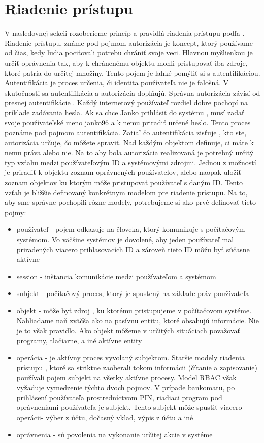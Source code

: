 \section{Riadenie prístupu}
V nasledovnej sekcii rozoberieme princíp a pravidlá riadenia prístupu podľa \cite{kuhn}. Riadenie prístupu, známe pod pojmom autorizácia je koncept, ktorý používame od čias, kedy ľudia pociťovali potrebu chrániť svoje veci. Hlavnou myšlienkou je určiť oprávnenia tak, aby k chránenému objektu mohli pristupovať iba zdroje, ktoré patria do určitej množiny. Tento pojem je ľahké pomýliť si s autentifikáciou. Autentifikácia je  proces určenia, či identita používateľa nie je falošná. V skutočnosti sa autentifikácia a autorizácia doplňujú. Správna autorizácia závisí od presnej autentifikácie . Každý internetový používateľ  rozdiel dobre pochopí na príklade zadávania hesla. Ak sa chce Janko prihlásiť do systému , musí zadať svoje používateľské meno janko96 a k nemu priradiť určené heslo. Tento proces poznáme pod pojmom autentifikácia.  Zatiaľ čo autentifikácia zisťuje , kto ste, autorizácia určuje, čo môžete spraviť. Nad každým objektom definuje, ci máte k nemu práva alebo nie. Na to aby bola autorizácia realizovaná je potrebný určitý typ vzťahu medzi používateľovým ID a systémovými zdrojmi. Jednou z možností je priradiť k objektu zoznam oprávnených používateľov, alebo naopak uložiť zoznam objektov ku ktorým môže pristupovať používateľ s daným ID. Tento vzťah je bližšie definovaný konkrétnym modelom pre riadenie prístupu. Na to, aby sme správne pochopili rôzne modely, potrebujeme si ako prvé definovať tieto pojmy:
\begin{itemize}
	\item používateľ - pojem odkazuje na človeka, ktorý komunikuje s počítačovým systémom. Vo väčšine systémov je dovolené, aby jeden používateľ mal priradených viacero prihlasovacích ID a zároveň tieto ID môžu byť súčasne aktívne  
	\item session - inštancia komunikácie medzi používateľom a systémom
	\item subjekt - počítačový proces, ktorý je spustený na základe práv používateľa
	\item objekt  - môže byť zdroj , ku ktorému pristupujeme v počítačovom systéme. Nahliadame naň zväčša ako na pasívnu entitu, ktoré obsahujú informácie. Nie je to však pravidlo. Ako objekt môžeme v určitých situáciach považovať programy, tlačiarne, a iné aktívne entity
	\item operácia - je aktívny proces vyvolaný subjektom. Staršie modely riadenia prístupu , ktoré sa striktne zaoberali tokom informácii (čítanie a zapisovanie) používali pojem subjekt na všetky aktívne procesy. Model RBAC však vyžaduje vymedzenie týchto dvoch pojmov. V prípade bankomatu, po prihlásení používateľa prostredníctvom PIN, riadiaci program pod oprávneniami používateľa je subjekt. Tento subjekt môže spustiť viacero operácii- výber z účtu, dočasný vklad, výpis z účtu a iné
	\item oprávnenia - sú povolenia na vykonanie určitej akcie v systéme
\end{itemize}



